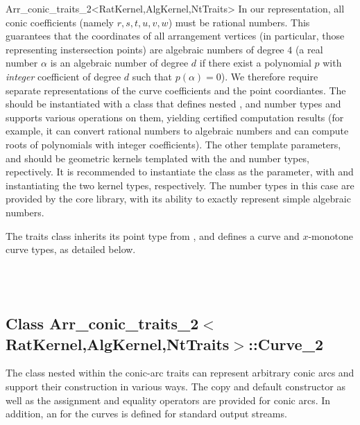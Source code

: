 \begin{ccRefClass}{Arr_conic_traits_2<RatKernel,AlgKernel,NtTraits>}
In our representation, all conic coefficients (namely $r, s, t, u, v, w$)
must be rational numbers. This guarantees that the coordinates of all
arrangement vertices (in particular, those representing instersection
points) are algebraic numbers of degree $4$ (a real number $\alpha$
is an algebraic number of degree $d$ if there exist a polynomial $p$ with
{\sl integer} coefficient of degree $d$ such that $p(\alpha) = 0$).
We therefore require separate representations of the curve coefficients and
the point coordiantes. The  should be instantiated with a class
that defines nested ,  and 
number types and supports various operations on them, yielding certified
computation results (for example, it can convert rational numbers to algebraic
numbers and can compute roots of polynomials with integer coefficients).
The other template parameters,  and  should be
geometric kernels templated with the  and
 number types, repectively.
It is recommended to instantiate the 
class as the  parameter, with
 and 
instantiating the two kernel types, respectively.
The number types in this case are provided by the {\sc core} library, with its
ability to exactly represent simple algebraic numbers.

The traits class inherits its point type from ,
and defines a curve and $x$-monotone curve types, as detailed below.

 
\ccIsModel
     \\
     \\

\subsection*{Class 
        Arr\_conic\_traits\_2$<$RatKernel,AlgKernel,NtTraits$>$::Curve\_2}

The  class nested within the conic-arc traits can represent
arbitrary conic arcs and support their construction in various ways.
The copy and default constructor as well as the assignment and equality
operators are provided for conic arcs. In addition, an 
for the curves is defined for standard output streams.


\end{ccRefClass}
